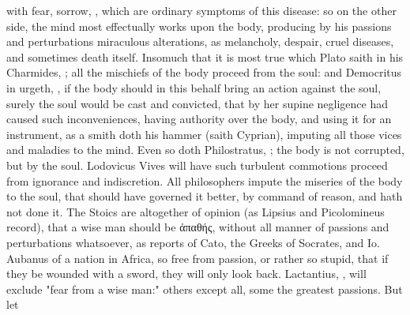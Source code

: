 with fear, sorrow, \etc{}, which are ordinary symptoms of this disease: so on
the other side, the mind most effectually works upon the body, producing by his
passions and perturbations miraculous alterations, as melancholy, despair,
cruel diseases, and sometimes death itself. Insomuch that it is most true which
Plato saith in his Charmides, ; all
the mischiefs of the body proceed from the soul: and
Democritus in \Plutarch{} urgeth, , if the body should in this behalf bring an action against the soul,
surely the soul would be cast and convicted, that by her supine negligence had
caused such inconveniences, having authority over the body, and using it for an
instrument, as a smith doth his hammer (saith Cyprian),
imputing all those vices and maladies to the mind. Even so doth
Philostratus, ; the body is not corrupted, but by the soul. Lodovicus Vives
will have such turbulent commotions proceed from ignorance and indiscretion.
All philosophers impute the miseries of the body to the
soul, that should have governed it better, by command of reason, and hath not
done it. The Stoics are altogether of opinion (as Lipsius
and Picolomineus record), that a wise man should be
\textgreek{ἀπαθής}, without all manner of passions and perturbations
whatsoever, as \Seneca{} reports of Cato, the
Greeks of Socrates, and Io. Aubanus
of a nation in Africa, so free from passion, or rather so stupid, that if they
be wounded with a sword, they will only look back.
Lactantius, , will exclude
"fear from a wise man:" others except all, some the greatest passions. But let

